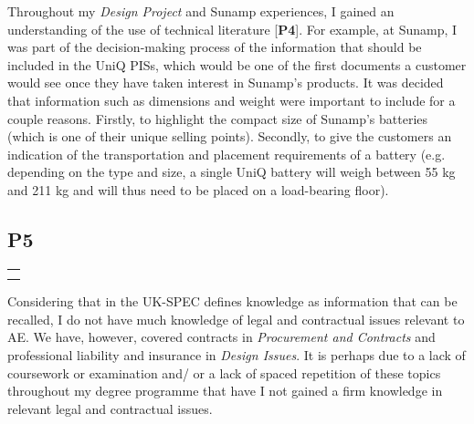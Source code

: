 Throughout my \textit{Design Project} and Sunamp experiences, I gained an understanding of the use of technical literature [\textbf{P4}].
For example, at Sunamp, I was part of the decision-making process of the information that should be included in the UniQ PISs, which would be one of the first documents a customer would see once they have taken interest in Sunamp's products.
It was decided that information such as dimensions and weight were important to include for a couple reasons.
Firstly, to highlight the compact size of Sunamp's batteries (which is one of their unique selling points).
Secondly, to give the customers an indication of the transportation and placement requirements of a battery (e.g. depending on the type and size, a single UniQ battery will weigh between 55 kg and 211 kg 
and will thus need to be placed on a load-bearing floor).


\subsection*{P5}

\begin{table}
	\begin{tabular}{|l|}
		\hline
		\rowcolor[HTML]{F8A102} 
		\multicolumn{1}{|c|}{\cellcolor[HTML]{F8A102}\textbf{P5}} \\ \hline
		\PC \\
		\DI \\ \hline
	\end{tabular}
\end{table}

Considering that in the UK-SPEC defines knowledge as information that can be recalled, I do not have much knowledge of legal and contractual issues relevant to AE.
We have, however, covered contracts in \textit{Procurement and Contracts} and professional liability and insurance in \textit{Design Issues}.
It is perhaps due to a lack of coursework or examination and/ or a lack of spaced repetition of these topics throughout my degree programme that have I not gained a firm knowledge in relevant legal and contractual issues.





